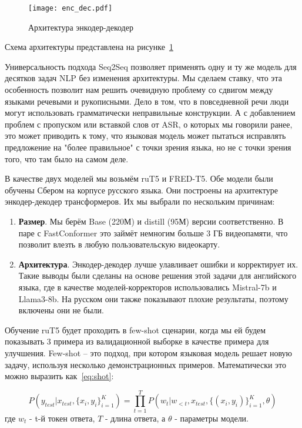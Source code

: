\begin{figure}[!t]
  \centering
  \texttt{[image: enc\_dec.pdf]}
  \caption{Архитектура энкодер-декодер}
  \label{fig:enc_dec}
\end{figure}

Схема архитектуры представлена на рисунке~\ref{fig:enc_dec}

Универсальность подхода Seq2Seq позволяет применять одну и ту же модель для десятков задач NLP без изменения архитектуры.
Мы сделаем ставку, что эта особенность позволит нам решить очевидную проблему со сдвигом между языками речевыми и рукописными.
Дело в том, что в повседневной речи люди могут использовать грамматически неправильные конструкции.
А с добавлением проблем с пропуском или вставкой слов от ASR, о которых мы говорили ранее, это может приводить к тому, что языковая модель может пытаться исправлять предложение на "более правильное" с точки зрения языка, но не с точки зрения того, что там было на самом деле.

В качестве двух моделей мы возьмём ruT5 и FRED-T5\cite{zmitrovich2023family}.
Обе модели были обучены Сбером на корпусе русского языка.
Они построены на архитектуре энкодер-декодер трансформеров.
Их мы выбрали по нескольким причинам:

\begin{enumerate}
  \item \textbf{Размер}.
  Мы берём Base (220М) и distill (95М) версии соответственно. 
  В паре с FastConformer это займёт немногим больше 3 ГБ видеопамяти, что позволит влезть в любую пользовательскую видеокарту.
  \item \textbf{Архитектура}.
  Энкодер-декодер лучше улавливает ошибки и корректирует их.
  Такие выводы были сделаны на основе решения этой задачи для английского языка\cite{iudinenhancing}, где в качестве моделей-корректоров использовались Mistral-7b и Llama3-8b\cite{grattafiori2024llama}.
  На русском они также показывают плохие результаты, поэтому включены они не были.
\end{enumerate}

Обучение ruT5 будет проходить в few-shot сценарии, когда мы ей будем показывать 3 примера из валидационной выборке в качестве примера для улучшения.
Few-shot -- это подход, при котором языковая модель решает новую задачу, используя несколько демонстрационных примеров.
Математически это можно выразить как~\ref{eq:shot}:

\begin{equation}
  P(y_{test}|x_{test},\{x_i,y_i\}^K_{i=1}) = \prod_{t=1}^{T}P(w_t|w_{<t},x_{test},\{(x_i,y_i)\}^K_{i=1},\theta)
  \label{eq:shot}
\end{equation}
где $w_t$ - t-й токен ответа, $T$ - длина ответа, а $\theta$ - параметры модели.

